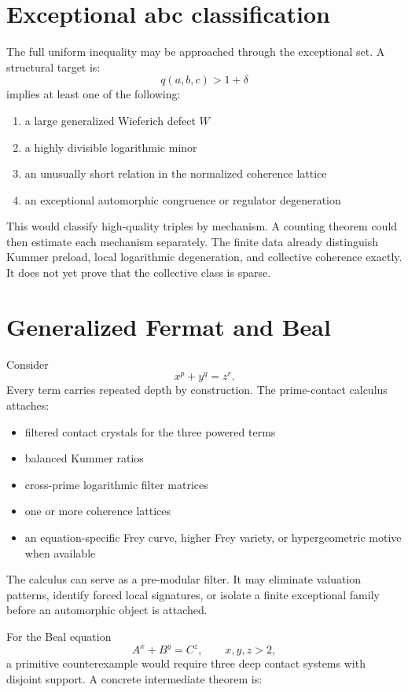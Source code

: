\section{Exceptional abc classification}
The full uniform inequality may be approached through the exceptional set. A structural target is:
\[
q(a,b,c)>1+\delta
\]
implies at least one of the following:
\begin{enumerate}[leftmargin=1.5em]
\item a large generalized Wieferich defect $W$
\item a highly divisible logarithmic minor
\item an unusually short relation in the normalized coherence lattice
\item an exceptional automorphic congruence or regulator degeneration
\end{enumerate}

This would classify high-quality triples by mechanism. A counting theorem could then estimate each mechanism separately. The finite data already distinguish Kummer preload, local logarithmic degeneration, and collective coherence exactly. It does not yet prove that the collective class is sparse.

\section{Generalized Fermat and Beal}
Consider
\[
x^p+y^q=z^r.
\]
Every term carries repeated depth by construction. The prime-contact calculus attaches:
\begin{itemize}[leftmargin=1.5em]
\item filtered contact crystals for the three powered terms
\item balanced Kummer ratios
\item cross-prime logarithmic filter matrices
\item one or more coherence lattices
\item an equation-specific Frey curve, higher Frey variety, or hypergeometric motive when available
\end{itemize}

The calculus can serve as a pre-modular filter. It may eliminate valuation patterns, identify forced local signatures, or isolate a finite exceptional family before an automorphic object is attached.

For the Beal equation
\[
A^x+B^y=C^z,
\qquad
x,y,z>2,
\]
a primitive counterexample would require three deep contact systems with disjoint support. A concrete intermediate theorem is:

